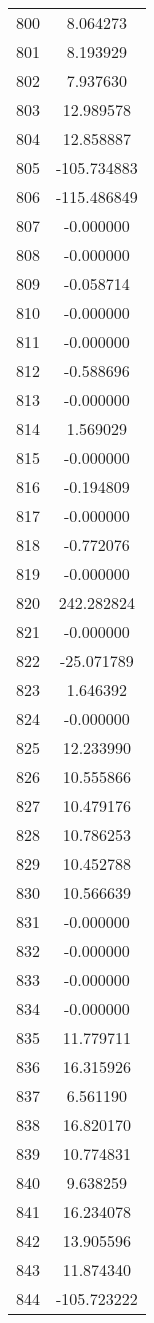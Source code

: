 \documentclass[12pt]{article}
\begin{document}
\begin{longtable}{@{}cc@{}}
800 & 8.064273 \\
801 & 8.193929 \\
802 & 7.937630 \\
803 & 12.989578 \\
804 & 12.858887 \\
805 & -105.734883 \\
806 & -115.486849 \\
807 & -0.000000 \\
808 & -0.000000 \\
809 & -0.058714 \\
810 & -0.000000 \\
811 & -0.000000 \\
812 & -0.588696 \\
813 & -0.000000 \\
814 & 1.569029 \\
815 & -0.000000 \\
816 & -0.194809 \\
817 & -0.000000 \\
818 & -0.772076 \\
819 & -0.000000 \\
820 & 242.282824 \\
821 & -0.000000 \\
822 & -25.071789 \\
823 & 1.646392 \\
824 & -0.000000 \\
825 & 12.233990 \\
826 & 10.555866 \\
827 & 10.479176 \\
828 & 10.786253 \\
829 & 10.452788 \\
830 & 10.566639 \\
831 & -0.000000 \\
832 & -0.000000 \\
833 & -0.000000 \\
834 & -0.000000 \\
835 & 11.779711 \\
836 & 16.315926 \\
837 & 6.561190 \\
838 & 16.820170 \\
839 & 10.774831 \\
840 & 9.638259 \\
841 & 16.234078 \\
842 & 13.905596 \\
843 & 11.874340 \\
844 & -105.723222 \\

\end{longtable}
\end{document}
